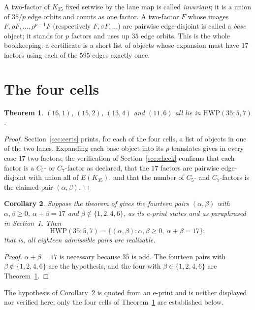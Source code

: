 \documentclass[11pt]{amsart}
\newtheorem{theorem}{Theorem}
\newtheorem{corollary}[theorem]{Corollary}
\newcommand{\HWP}{\mathrm{HWP}}
\begin{document}
A two-factor of $K_{35}$ fixed setwise by the lane map is called
\emph{invariant}; it is a union of $35/p$ edge orbits and counts as one
factor. A two-factor $F$ whose images $F,\rho F,\dots,\rho^{p-1}F$
(respectively $F,\sigma F,\dots$) are pairwise edge-disjoint is called a
\emph{base} object; it stands for $p$ factors and uses up $35$ edge
orbits. This is the whole bookkeeping: a certificate is a short list of
objects whose expansion must have $17$ factors using each of the $595$
edges exactly once.

\section{The four cells}

\begin{theorem}\label{thm:main}
$(16,1)$, $(15,2)$, $(13,4)$ and $(11,6)$ all lie in
$\HWP(35;5,7)$.
\end{theorem}

\begin{proof}
Section~\ref{sec:certs} prints, for each of the four cells, a list of
objects in one of the two lanes. Expanding each base object into its
$p$ translates gives in every case $17$ two-factors; the verification
of Section~\ref{sec:check} confirms that each factor is a $C_5$- or
$C_7$-factor as declared, that the $17$ factors are pairwise
edge-disjoint with union all of $E(K_{35})$, and that the number of
$C_5$- and $C_7$-factors is the claimed pair $(\alpha,\beta)$.
\end{proof}

\begin{corollary}\label{cor:complete}
Suppose the theorem of \cite{WLC} gives the fourteen pairs
$(\alpha,\beta)$ with $\alpha,\beta\ge0$, $\alpha+\beta=17$ and
$\beta\notin\{1,2,4,6\}$, as its e-print states and as paraphrased in
Section~1. Then
\[
  \HWP(35;5,7)=\{(\alpha,\beta):\alpha,\beta\ge0,\ \alpha+\beta=17\};
\]
that is, all eighteen admissible pairs are realizable.
\end{corollary}

\begin{proof}
$\alpha+\beta=17$ is necessary because $35$ is odd. The fourteen pairs
with $\beta\notin\{1,2,4,6\}$ are the hypothesis, and the four
with $\beta\in\{1,2,4,6\}$ are Theorem~\ref{thm:main}.
\end{proof}

The hypothesis of Corollary~\ref{cor:complete} is quoted from an e-print
and is neither displayed nor verified here; only the four cells of
Theorem~\ref{thm:main} are established below.
\end{document}
